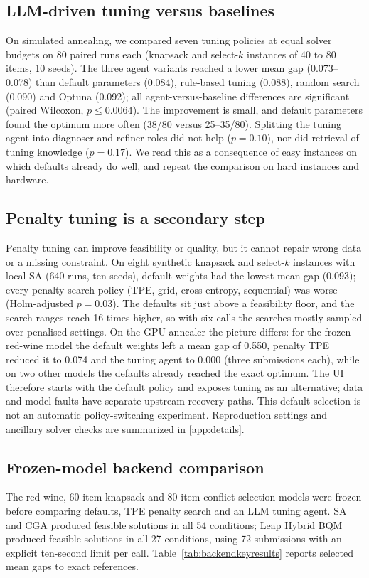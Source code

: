 \subsection{LLM-driven tuning versus baselines}
\label{sec:tuningcomparison}
On simulated annealing, we compared seven tuning policies at equal solver budgets on 80 paired runs each
(knapsack and select-$k$ instances of 40 to 80 items, 10 seeds). The three agent variants reached a lower mean gap
(0.073--0.078) than default parameters (0.084), rule-based tuning (0.088), random search (0.090) and Optuna
(0.092); all agent-versus-baseline differences are significant (paired Wilcoxon, $p\le 0.0064$). The improvement is
small, and default parameters found the optimum more often (38/80 versus 25--35/80). Splitting the tuning agent
into diagnoser and refiner roles did not help ($p=0.10$), nor did retrieval of tuning knowledge ($p=0.17$). We
read this as a consequence of easy instances on which defaults already do well, and repeat the comparison on hard
instances and hardware. 

\subsection{Penalty tuning is a secondary step}
\label{sec:penaltysummary}
Penalty tuning can improve feasibility or quality, but it cannot repair wrong data or a missing constraint.
On eight synthetic knapsack and select-$k$ instances with local SA (640 runs, ten seeds), default weights had the
lowest mean gap (0.093); every penalty-search policy (TPE, grid, cross-entropy, sequential) was worse (Holm-adjusted
$p=0.03$). The defaults sit just above a feasibility floor, and the search ranges reach 16 times higher, so with six
calls the searches mostly sampled over-penalised settings. On the GPU annealer the picture differs: for the frozen
red-wine model the default weights left a mean gap of 0.550, penalty TPE reduced it to 0.074 and the tuning agent
to 0.000 (three submissions each), while on two other models the defaults already reached the exact optimum. The
UI therefore starts with the default policy and exposes tuning as an alternative; data and model faults have
separate upstream recovery paths. This default selection is not an automatic policy-switching experiment. Reproduction settings and ancillary
solver checks are summarized in \cref{app:details}.

\subsection{Frozen-model backend comparison}
\label{sec:additionalexperiments}
\label{sec:dwavehybrid}
The red-wine, 60-item knapsack and 80-item conflict-selection models were frozen before comparing defaults,
TPE penalty search and an LLM tuning agent. SA and CGA produced feasible solutions in all 54 conditions;
Leap Hybrid BQM produced feasible solutions in all 27 conditions, using 72 submissions with an explicit
ten-second limit per call. Table~\ref{tab:backendkeyresults} reports selected mean gaps to exact references.

